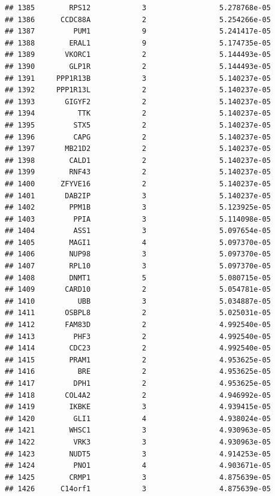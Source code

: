 \documentclass[
]{article}
\begin{document}
\begin{verbatim}
## 1385        RPS12            3                 5.278768e-05
## 1386      CCDC88A            2                 5.254266e-05
## 1387         PUM1            9                 5.241417e-05
## 1388        ERAL1            9                 5.174735e-05
## 1389       VKORC1            2                 5.144493e-05
## 1390        GLP1R            2                 5.144493e-05
## 1391     PPP1R13B            3                 5.140237e-05
## 1392     PPP1R13L            2                 5.140237e-05
## 1393       GIGYF2            2                 5.140237e-05
## 1394          TTK            2                 5.140237e-05
## 1395         STX5            2                 5.140237e-05
## 1396         CAPG            2                 5.140237e-05
## 1397       MB21D2            2                 5.140237e-05
## 1398        CALD1            2                 5.140237e-05
## 1399        RNF43            2                 5.140237e-05
## 1400      ZFYVE16            2                 5.140237e-05
## 1401       DAB2IP            3                 5.140237e-05
## 1402        PPM1B            3                 5.123925e-05
## 1403         PPIA            3                 5.114098e-05
## 1404         ASS1            3                 5.097654e-05
## 1405        MAGI1            4                 5.097370e-05
## 1406        NUP98            3                 5.097370e-05
## 1407        RPL10            3                 5.097370e-05
## 1408        DNMT1            5                 5.080715e-05
## 1409       CARD10            2                 5.054781e-05
## 1410          UBB            3                 5.034887e-05
## 1411       OSBPL8            2                 5.025031e-05
## 1412       FAM83D            2                 4.992540e-05
## 1413         PHF3            2                 4.992540e-05
## 1414        CDC23            2                 4.992540e-05
## 1415        PRAM1            2                 4.953625e-05
## 1416          BRE            2                 4.953625e-05
## 1417         DPH1            2                 4.953625e-05
## 1418       COL4A2            2                 4.946992e-05
## 1419        IKBKE            3                 4.939415e-05
## 1420         GLI1            4                 4.938024e-05
## 1421        WHSC1            3                 4.930963e-05
## 1422         VRK3            3                 4.930963e-05
## 1423        NUDT5            3                 4.914253e-05
## 1424         PNO1            4                 4.903671e-05
## 1425        CRMP1            3                 4.875639e-05
## 1426      C14orf1            3                 4.875639e-05

\end{verbatim}
\end{document}
